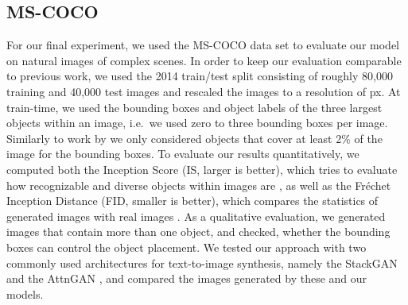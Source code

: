 \documentclass{article} \usepackage{iclr2019_conference,times}
\begin{document}
	\subsection{MS-COCO}
	For our final experiment, we used the MS-COCO data set \citep{lin2014microsoft} to evaluate our model on natural images of complex scenes.
	In order to keep our evaluation comparable to previous work, we used the 2014 train/test split consisting of roughly 80,000 training and 40,000 test images and rescaled the images to a resolution of  px.
	At train-time, we used the bounding boxes and object labels of the three largest objects within an image, i.e.\ we used zero to three bounding boxes per image.
	Similarly to work by \cite{johnson2018image} we only considered objects that cover at least 2\% of the image for the bounding boxes.
	To evaluate our results quantitatively, we computed both the Inception Score (IS, larger is better), which tries to evaluate how recognizable and diverse objects within images are \citep{salimans2016improved}, as well as the Fr\'{e}chet Inception Distance (FID, smaller is better), which compares the statistics of generated images with real images \citep{heusel2017gans}.
	As a qualitative evaluation, we generated images that contain more than one object, and checked, whether the bounding boxes can control the object placement.
	We tested our approach with two commonly used architectures for text-to-image synthesis, namely the StackGAN \citep{zhang2017stackgan} and the AttnGAN \citep{xu2017attngan}, and compared the images generated by these and our models.
	
\end{document}
